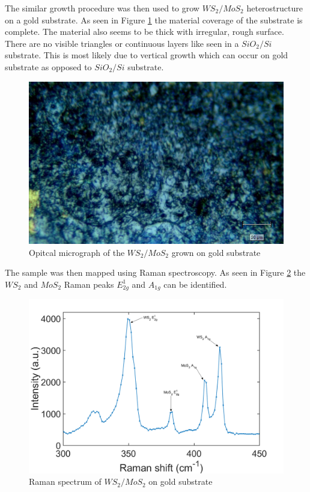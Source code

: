 The similar growth procedure was then used to grow $WS_2/MoS_2$ heterostructure on a gold substrate. As seen in Figure \ref{fig:HeterostructuresOMAu} the material coverage of the substrate is complete. The material also seems to be thick with irregular, rough surface. There are no visible triangles or continuous layers like seen in a $SiO_2/Si$ substrate. This is most likely due to vertical growth which can occur on gold substrate as opposed to $SiO_2/Si$ substrate.

\begin{figure}[h]
	\begin{center}
		\includegraphics[scale=0.3]{Heterostructures/OMAu.png}
		\caption{Opitcal micrograph of the $WS_2/MoS_2$ grown on gold substrate}
		\label{fig:HeterostructuresOMAu}
	\end{center}
\end{figure}

The sample was then mapped using Raman spectroscopy. As seen in Figure \ref{fig:HeterostructuresRamanSpectrumAu} the $WS_2$ and $MoS_2$ Raman peaks $E^1_{2g}$ and $A_{1g}$ can be identified.

\begin{figure}[h]
	\begin{center}
		\includegraphics[scale=0.3]{Heterostructures/RamanSpectrumAu.png}
		\caption{Raman spectrum of $WS_2/MoS_2$ on gold substrate}
		\label{fig:HeterostructuresRamanSpectrumAu}
	\end{center}
\end{figure}

